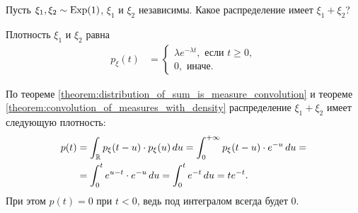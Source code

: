 \documentclass[../main.tex]{subfiles}
\begin{document}
\begin{exmpl}
 Пусть $ \xi_1,\xi_2 \sim \mathrm{Exp}(1) $, $ \xi_1 $ и $ \xi_2 $ независимы. Какое распределение имеет $ \xi_1+\xi_2 $?

 Плотность $ \xi_1 $ и $ \xi_2 $ равна
 \begin{align*}
  p_\xi(t) &= \begin{cases}
   \lambda e^{-\lambda t}, \text{ если } t\geqslant 0,  \\
   0, \text{ иначе. }
  \end{cases} 
 \end{align*}

 По теореме \ref{theorem:distribution_of_sum_is_measure_convolution} и теореме \ref{theorem:convolution_of_measures_with_density} распределение $ \xi_1 + \xi_2 $ имеет следующую плотность:
 \begin{align*}
  p(t) &= \int_{\mathbb{R}} p_\xi(t - u) \cdot p_\xi(u)\,du = \int_{0}^{+\infty} p_\xi(t-u) \cdot e^{-u}\,du = \\
  &= \int_{0}^{t} e^{u-t} \cdot e^{-u}\,du = \int_{0}^{t} e^{-t}\,du = te^{-t}.
 \end{align*} При этом $ p(t) = 0 $ при $ t < 0 $, ведь под интегралом всегда будет $ 0 $.
\end{exmpl}
\end{document}
